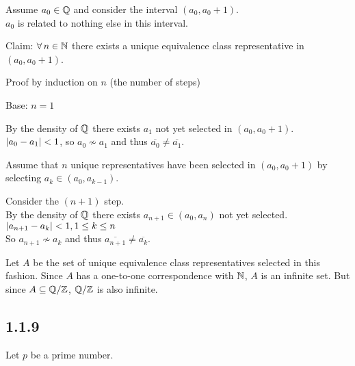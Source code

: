 \documentclass[letterpaper,12pt,fleqn]{article}
\newcommand{\ec}[1]{\overline{#1}}
\begin{document}
\begin{enumerate}[label=\alph*)]
  Assume $a_0\in\mathbb{Q}$ and consider the interval $(a_0,a_0+1)$. \\
  $a_0$ is related to nothing else in this interval.
    
  Claim: $\forall\,n\in\mathbb{N}$ there exists a unique equivalence class
  representative in $(a_0,a_0+1)$.

  Proof by induction on $n$ (the number of steps)

  \begin{description}
  \item Base: $n=1$

    By the density of $\mathbb{Q}$ there exists $a_1$ not yet selected in
    $(a_0,a_0+1)$. \\
    $\lvert a_0-a_1\rvert<1$, so $a_0\nsim a_1$ and thus $\ec{a_0}\ne\ec{a_1}$.

    Assume that $n$ unique representatives have been selected in $(a_0,a_0+1)$
    by selecting $a_k\in(a_0,a_{k-1})$.

    Consider the $(n+1)$ step. \\
    By the density of $\mathbb{Q}$ there exists $a_{n+1}\in(a_0,a_n)$ not yet
    selected. \\
    $\lvert a_{n+1}-a_k\rvert<1,1\le k\le n$ \\
    So $a_{n+1}\nsim a_k$ and thus $\ec{a_{n+1}}\ne\ec{a_k}$.
  \end{description}

  Let $A$ be the set of unique equivalence class representatives selected in
  this fashion. Since $A$ has a one-to-one correspondence with $\mathbb{N}$, $A$ is an
  infinite set. But since $A\subseteq\mathbb{Q}/\mathbb{Z}$, $\mathbb{Q}/\mathbb{Z}$ is also infinite.
\end{enumerate}

\subsection*{1.1.9}

Let $p$ be a prime number.
\end{document}

